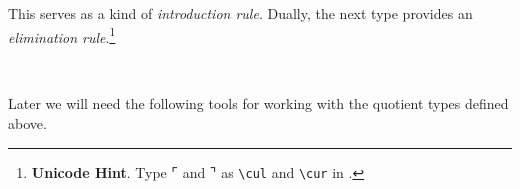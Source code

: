 \ccpad
This serves as a kind of \emph{introduction rule}.  Dually, the next type provides an \emph{elimination rule}.\footnote{%
\textbf{Unicode Hint}. Type \af ⌜ and \af ⌝ as \texttt{\textbackslash{}cul} and \texttt{\textbackslash{}cur} in \agdamode.}
\ccpad
\begin{code}%
\>[0][@{}l@{\AgdaIndent{1}}]%
\>[1]\AgdaSpace{}%
\AgdaSymbol{:}\AgdaSpace{}%
\AgdaSymbol{\{}\AgdaSpace{}%
\AgdaSymbol{:}\AgdaSpace{}%
\AgdaSpace{}%
\AgdaSymbol{\}\{}\AgdaSpace{}%
\AgdaSymbol{:}\AgdaSpace{}%
\AgdaSpace{}%
\AgdaSpace{}%
\AgdaSymbol{\}}\AgdaSpace{}%
\AgdaSpace{}%
\AgdaSpace{}%
\AgdaOperator{\AgdaFunction{/}}\AgdaSpace{}%
%
\>[39]\AgdaSpace{}%
\<%
\\
%
\>[1]\AgdaSpace{}%
\AgdaSpace{}%
\AgdaOperator{\AgdaInductiveConstructor{,}}\AgdaSpace{}%
\AgdaSymbol{(}\AgdaSpace{}%
\AgdaOperator{\AgdaInductiveConstructor{,}}\AgdaSpace{}%
\AgdaSymbol{)}\AgdaSpace{}%
\AgdaSpace{}%
\AgdaSymbol{=}\AgdaSpace{}%
\<%
\end{code}
\ccpad
Later we will need the following tools for working with the quotient types defined above.
\ccpad
